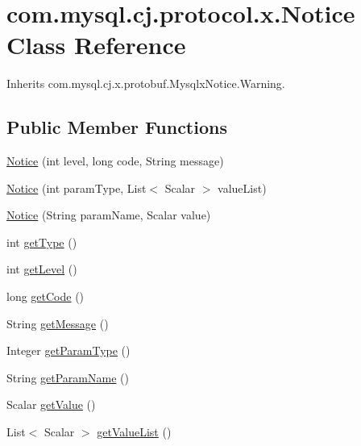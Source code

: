 \hypertarget{classcom_1_1mysql_1_1cj_1_1protocol_1_1x_1_1_notice}{}\section{com.\+mysql.\+cj.\+protocol.\+x.\+Notice Class Reference}
\label{classcom_1_1mysql_1_1cj_1_1protocol_1_1x_1_1_notice}


Inherits com.\+mysql.\+cj.\+x.\+protobuf.\+Mysqlx\+Notice.\+Warning.

\subsection*{Public Member Functions}
\begin{DoxyCompactItemize}
\item 
\mbox{\hyperlink{classcom_1_1mysql_1_1cj_1_1protocol_1_1x_1_1_notice_a393f2c56e3f27bd7886c20c5d0b112c6}{Notice}} (int level, long code, String message)
\item 
\mbox{\hyperlink{classcom_1_1mysql_1_1cj_1_1protocol_1_1x_1_1_notice_a04ad1c9c83f266ad5912c6a641bc500d}{Notice}} (int param\+Type, List$<$ Scalar $>$ value\+List)
\item 
\mbox{\hyperlink{classcom_1_1mysql_1_1cj_1_1protocol_1_1x_1_1_notice_aef110aa59a1ea329f80bbe1517fe348f}{Notice}} (String param\+Name, Scalar value)
\item 
int \mbox{\hyperlink{classcom_1_1mysql_1_1cj_1_1protocol_1_1x_1_1_notice_a2e5d7dedbf19dc70b55dddb689af5c86}{get\+Type}} ()
\item 
int \mbox{\hyperlink{classcom_1_1mysql_1_1cj_1_1protocol_1_1x_1_1_notice_adfa9327778b49a0e05d9a9620263e622}{get\+Level}} ()
\item 
long \mbox{\hyperlink{classcom_1_1mysql_1_1cj_1_1protocol_1_1x_1_1_notice_aa2a4395f9869d4d04470a233eefcb79f}{get\+Code}} ()
\item 
String \mbox{\hyperlink{classcom_1_1mysql_1_1cj_1_1protocol_1_1x_1_1_notice_a6ffea4ce470da852b49bef0feccf7cf4}{get\+Message}} ()
\item 
Integer \mbox{\hyperlink{classcom_1_1mysql_1_1cj_1_1protocol_1_1x_1_1_notice_a5ec4ac9d0211206e6862177172ab5f72}{get\+Param\+Type}} ()
\item 
String \mbox{\hyperlink{classcom_1_1mysql_1_1cj_1_1protocol_1_1x_1_1_notice_aa67c5eaf92c52963ff1ebb20270093b3}{get\+Param\+Name}} ()
\item 
Scalar \mbox{\hyperlink{classcom_1_1mysql_1_1cj_1_1protocol_1_1x_1_1_notice_acf459530193ca9f80fe37e5f7d2d0da7}{get\+Value}} ()
\item 
List$<$ Scalar $>$ \mbox{\hyperlink{classcom_1_1mysql_1_1cj_1_1protocol_1_1x_1_1_notice_a347b04bd92b2429a697b0ba2b97e69e1}{get\+Value\+List}} ()
\end{DoxyCompactItemize}
